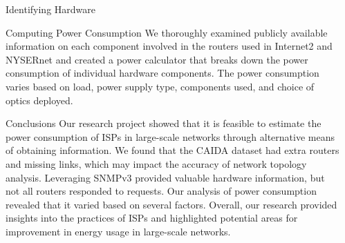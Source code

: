\documentclass[final]{beamer}
\newlength{\sepwidth}
\newlength{\colwidth}
\newcommand{\separatorcolumn}{\begin{column}{\sepwidth}\end{column}}
\begin{document}
\begin{frame}[t]
\begin{columns}[t]
\begin{column}{\colwidth}
\begin{block}{Identifying Hardware}


\end{block}

\begin{block}{Computing Power Consumption}
We thoroughly examined publicly available information on each component involved in the routers used in Internet2 and NYSERnet and created a power calculator that breaks down the power consumption of individual hardware components. The power consumption varies based on load, power supply type, components used, and choice of optics deployed.
\


\end{block}
\begin{block}{Conclusions}
Our research project showed that it is feasible to estimate the power consumption of ISPs in large-scale networks through alternative means of obtaining information. We found that the CAIDA dataset had extra routers and missing links, which may impact the accuracy of network topology analysis. Leveraging SNMPv3 provided valuable hardware information, but not all routers responded to requests. Our analysis of power consumption revealed that it varied based on several factors. Overall, our research provided insights into the practices of ISPs and highlighted potential areas for improvement in energy usage in large-scale networks.
\end{block}
\end{column}
\separatorcolumn

\end{columns}
\end{frame}
\end{document}
